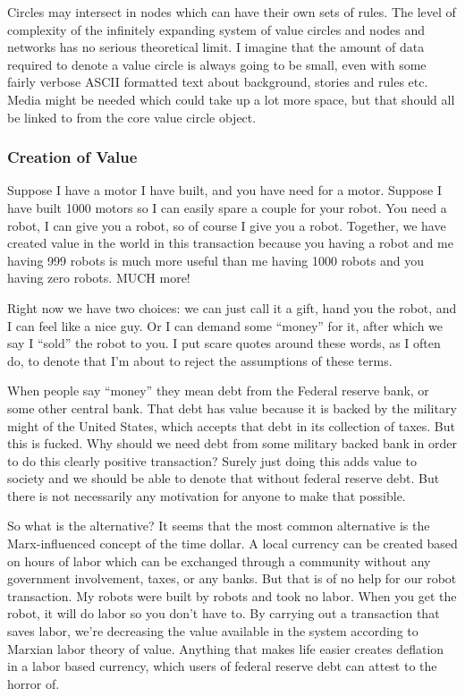 Circles may intersect in nodes which can have their own sets of rules.
The level of complexity of the infinitely expanding system of value
circles and nodes and networks has no serious theoretical limit. I
imagine that the amount of data required to denote a value circle is
always going to be small, even with some fairly verbose ASCII formatted
text about background, stories and rules etc. Media might be needed
which could take up a lot more space, but that should all be linked to
from the core value circle object.

\subsubsection{Creation of Value}\label{creation-of-value}

Suppose I have a motor I have built, and you have need for a motor.
Suppose I have built 1000 motors so I can easily spare a couple for your
robot. You need a robot, I can give you a robot, so of course I give you
a robot. Together, we have created value in the world in this
transaction because you having a robot and me having 999 robots is much
more useful than me having 1000 robots and you having zero robots. MUCH
more!

Right now we have two choices: we can just call it a gift, hand you the
robot, and I can feel like a nice guy. Or I can demand some ``money''
for it, after which we say I ``sold'' the robot to you. I put scare
quotes around these words, as I often do, to denote that I'm about to
reject the assumptions of these terms.

When people say ``money'' they mean debt from the Federal reserve bank,
or some other central bank. That debt has value because it is backed by
the military might of the United States, which accepts that debt in its
collection of taxes. But this is fucked. Why should we need debt from
some military backed bank in order to do this clearly positive
transaction? Surely just doing this adds value to society and we should
be able to denote that without federal reserve debt. But there is not
necessarily any motivation for anyone to make that possible.

So what is the alternative? It seems that the most common alternative is
the Marx-influenced concept of the time dollar. A local currency can be
created based on hours of labor which can be exchanged through a
community without any government involvement, taxes, or any banks. But
that is of no help for our robot transaction. My robots were built by
robots and took no labor. When you get the robot, it will do labor so
you don't have to. By carrying out a transaction that saves labor, we're
decreasing the value available in the system according to Marxian labor
theory of value. Anything that makes life easier creates deflation in a
labor based currency, which users of federal reserve debt can attest to
the horror of.

